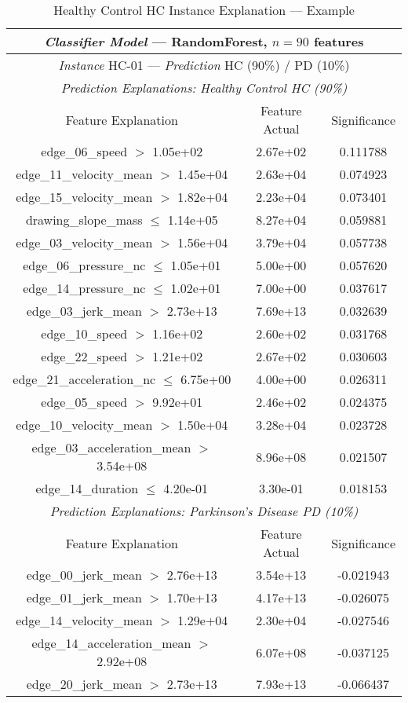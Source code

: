 \begin{table}[]
\centering
\begin{tabular}{ccc}
\toprule
\multicolumn{3}{c}{\textit{Classifier Model} --- RandomForest, $n=90$ features}\\
\midrule
\multicolumn{3}{c}{\textit{Instance} HC-01 --- \textit{Prediction} HC (90\%) / PD (10\%)}\\
\midrule
\multicolumn{3}{c}{\textit{Prediction Explanations: Healthy Control HC (90\%)}}\\
Feature Explanation & Feature Actual & Significance \\
\toprule
 edge\_06\_speed $>$ 1.05e+02 &  2.67e+02 &  0.111788 \\
 edge\_11\_velocity\_mean $>$ 1.45e+04 &  2.63e+04 &  0.074923 \\
 edge\_15\_velocity\_mean $>$ 1.82e+04 &  2.23e+04 &  0.073401 \\
 drawing\_slope\_mass $\leq$ 1.14e+05 &  8.27e+04 &  0.059881 \\
 edge\_03\_velocity\_mean $>$ 1.56e+04 &  3.79e+04 &  0.057738 \\
 edge\_06\_pressure\_nc $\leq$ 1.05e+01 &  5.00e+00 &  0.057620 \\
 edge\_14\_pressure\_nc $\leq$ 1.02e+01 &  7.00e+00 &  0.037617 \\
 edge\_03\_jerk\_mean $>$ 2.73e+13 &  7.69e+13 &  0.032639 \\
 edge\_10\_speed $>$ 1.16e+02 &  2.60e+02 &  0.031768 \\
 edge\_22\_speed $>$ 1.21e+02 &  2.67e+02 &  0.030603 \\
 edge\_21\_acceleration\_nc $\leq$ 6.75e+00 &  4.00e+00 &  0.026311 \\
 edge\_05\_speed $>$ 9.92e+01 &  2.46e+02 &  0.024375 \\
 edge\_10\_velocity\_mean $>$ 1.50e+04 &  3.28e+04 &  0.023728 \\
 edge\_03\_acceleration\_mean $>$ 3.54e+08 &  8.96e+08 &  0.021507 \\
 edge\_14\_duration $\leq$ 4.20e-01 &  3.30e-01 &  0.018153 \\
 \midrule
\multicolumn{3}{c}{\textit{Prediction Explanations: Parkinson's Disease PD (10\%)}}\\
Feature Explanation & Feature Actual & Significance \\
\toprule
 edge\_00\_jerk\_mean $>$ 2.76e+13 &  3.54e+13 & -0.021943 \\
 edge\_01\_jerk\_mean $>$ 1.70e+13 &  4.17e+13 & -0.026075 \\
 edge\_14\_velocity\_mean $>$ 1.29e+04 &  2.30e+04 & -0.027546 \\
 edge\_14\_acceleration\_mean $>$ 2.92e+08 &  6.07e+08 & -0.037125 \\
 edge\_20\_jerk\_mean $>$ 2.73e+13 &  7.93e+13 & -0.066437 \\
\bottomrule
\end{tabular}
\caption{Healthy Control HC Instance Explanation --- Example}
\label{explanation2}
\end{table}